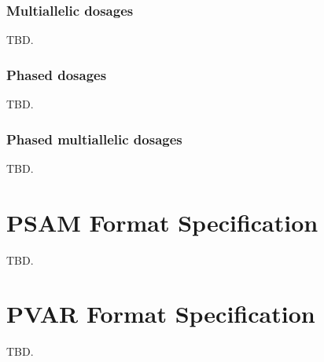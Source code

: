 \documentclass[8pt]{article}
\begin{document}
\subsubsection{Multiallelic dosages}

TBD.

\subsubsection{Phased dosages}

TBD.

\subsubsection{Phased multiallelic dosages}

TBD.

\section{PSAM Format Specification}

TBD.

\section{PVAR Format Specification}

TBD.
\end{document}
